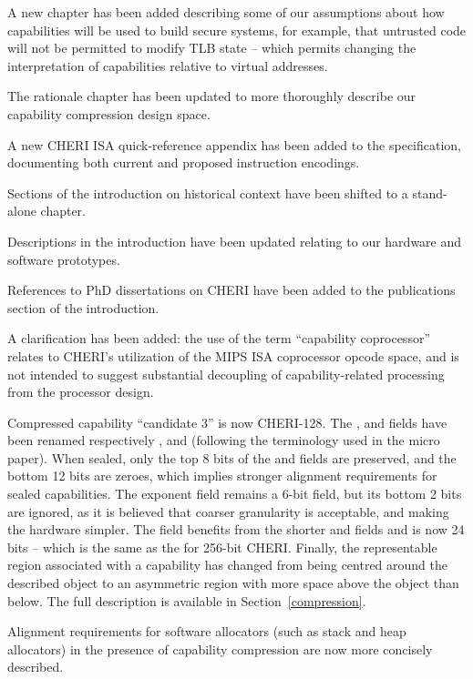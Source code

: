 \begin{description}
  A new chapter has been added describing some of our assumptions about how
  capabilities will be used to build secure systems, for example, that
  untrusted code will not be permitted to modify TLB state -- which permits
  changing the interpretation of capabilities relative to virtual addresses.

  The rationale chapter has been updated to more thoroughly describe our
  capability compression design space.

  A new CHERI ISA quick-reference appendix has been added to the
  specification, documenting both current and proposed instruction
  encodings.

  Sections of the introduction on historical context have been shifted to a
  stand-alone chapter.

  Descriptions in the introduction have been updated relating to
  our hardware and software prototypes.

  References to PhD dissertations on CHERI have been added to the publications
  section of the introduction.

  A clarification has been added: the use of the term ``capability
  coprocessor'' relates to CHERI's utilization of the MIPS ISA coprocessor
  opcode space, and is not intended to suggest substantial decoupling of
  capability-related processing from the processor design.

  Compressed capability ``candidate 3'' is now CHERI-128. The \cbasebits{},
  \ctopbits{} and
  \ccursor{} fields have been renamed respectively \cB{}, \cT{} and \caddr{}
  (following the terminology used in the micro paper). When sealed, only the
  top 8 bits of the \cB{} and \cT{} fields are preserved, and the bottom 12
  bits are zeroes, which implies stronger alignment requirements for sealed
  capabilities. The exponent \cexponent{} field remains a 6-bit field, but its
  bottom 2 bits are ignored, as it is believed that coarser granularity is
  acceptable, and making the hardware simpler. The \cotype{} field benefits
  from the shorter \cB{} and \cT{} fields and is now 24 bits -- which is the same
  as the \cotype{} for 256-bit CHERI. Finally, the representable region
  associated with a capability has changed from being centred around the
  described object to an asymmetric region with more space above the object
  than below. The full description is available in Section~\ref{compression}.

  Alignment requirements for software allocators (such as stack and heap
  allocators) in the presence of capability compression are now more
  concisely described.


\end{description}
